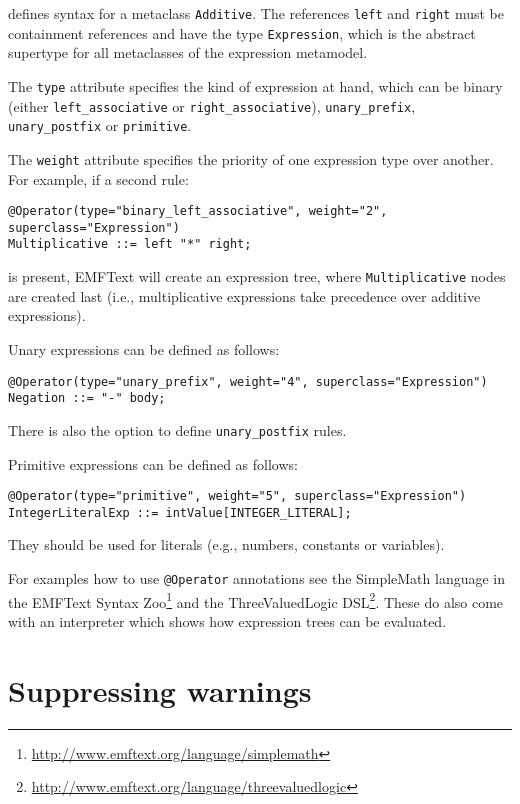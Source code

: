 defines syntax for a metaclass \texttt{Additive}. The references
\texttt{left} and \texttt{right} must be containment references and have the type
\texttt{Expression}, which is the abstract supertype for all metaclasses of the 
expression metamodel.

The \texttt{type} attribute specifies the kind of expression at hand, which can
be binary (either \texttt{left\_associative} or \texttt{right\_associative}),
\texttt{unary\_prefix}, \texttt{unary\_postfix} or \texttt{primitive}.

The \texttt{weight} attribute specifies the priority of one expression type over
another. For example, if a second rule:

\begin{lstlisting}
@Operator(type="binary_left_associative", weight="2", superclass="Expression")
Multiplicative ::= left "*" right;
\end{lstlisting}

is present, EMFText will create an expression tree, where
\texttt{Multiplicative} nodes are created last (i.e., multiplicative expressions 
take precedence over additive expressions).

Unary expressions can be defined as follows:

\begin{lstlisting}
@Operator(type="unary_prefix", weight="4", superclass="Expression")	
Negation ::= "-" body;
\end{lstlisting}

There is also the option to define \texttt{unary\_postfix} rules.

Primitive expressions can be defined as follows:

\begin{lstlisting}
@Operator(type="primitive", weight="5", superclass="Expression")
IntegerLiteralExp ::= intValue[INTEGER_LITERAL];
\end{lstlisting}

They should be used for literals (e.g., numbers, constants or variables).

For examples how to use \texttt{@Operator} annotations see the SimpleMath
language in the EMFText Syntax
Zoo\footnote{\url{http://www.emftext.org/language/simplemath}} and the
ThreeValuedLogic
DSL\footnote{\url{http://www.emftext.org/language/threevaluedlogic}}. These do
also come with an interpreter which shows how expression trees can be evaluated.

\section{Suppressing warnings}

